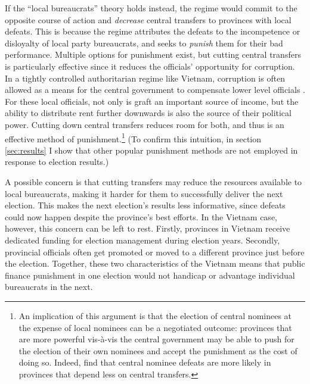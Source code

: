 \documentclass[12pt]{article}\usepackage[]{graphicx}\usepackage[]{color}
\newcommand{\1}{\mathbbm{1}}
\begin{document}
If the ``local bureaucrats'' theory holds instead, the regime would commit to the opposite course of action and \textit{decrease} central transfers to provinces with local defeats. This is because the regime attributes the defeats to the incompetence or disloyalty of local party bureaucrats, and seeks to \textit{punish} them for their bad performance. Multiple options for punishment exist, but cutting central transfers is particularly effective since it reduces the officials' opportunity for corruption. In a tightly controlled authoritarian regime like Vietnam, corruption is often allowed as a means for the central government to compensate lower level officials \citep{Darden2008}. For these local officials, not only is graft an important source of income, but the ability to distribute rent further downwards is also the source of their political power. Cutting down central transfers reduces room for both, and thus is an effective method of punishment.\footnote{An implication of this argument is that the election of central nominees at the expense of local nominees can be a negotiated outcome: provinces that are more powerful vis-\`{a}-vis the central government may be able to push for the election of their own nominees and accept the punishment as the cost of doing so. Indeed, \cite{MaleskySchuler2011} find that central nominee defeats are more likely in provinces that depend less on central transfers.} (To confirm this intuition, in section \ref{sec:results} I show that other popular punishment methods are not employed in response to election results.)

A possible concern is that cutting transfers may reduce the resources available to local bureaucrats, making it harder for them to successfully deliver the next election. This makes the next election's results less informative, since defeats could now happen despite the province's best efforts. In the Vietnam case, however, this concern can be left to rest. Firstly, provinces in Vietnam receive dedicated funding for election management during election years. Secondly, provincial officials often get promoted or moved to a different province just before the election. Together, these two characteristics of the Vietnam means that public finance punishment in one election would not handicap or advantage individual bureaucrats in the next.
\end{document}
